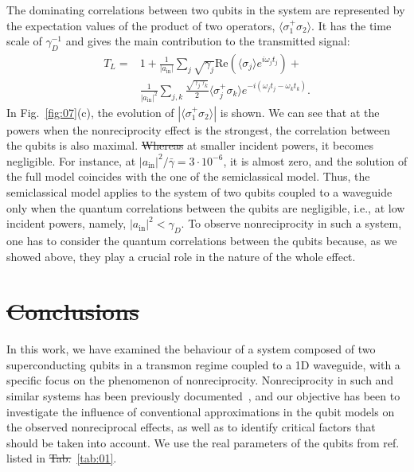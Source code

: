 \documentclass[lettersize,journal]{IEEEtran}
\providecommand{\DIFaddtex}[1]{{\protect\color{blue}\uwave{#1}}} %
\providecommand{\DIFdeltex}[1]{{\protect\color{red}\sout{#1}}}                      %
\providecommand{\DIFaddbegin}{} %
\providecommand{\DIFaddend}{} %
\providecommand{\DIFdelbegin}{} %
\providecommand{\DIFdelend}{} %
\providecommand{\DIFadd}[1]{\texorpdfstring{\DIFaddtex{#1}}{#1}} %
\providecommand{\DIFdel}[1]{\texorpdfstring{\DIFdeltex{#1}}{}} %
\newcommand{\DIFscaledelfig}{0.5}
\newlength{\DIFdelgraphicswidth} %
\newlength{\DIFdelgraphicsheight} %
\newcommand{\DIFaddincludegraphics}[2][]{{\color{blue}\fbox{\DIFOincludegraphics[#1]{#2}}}} %
\newcommand{\DIFdelincludegraphics}[2][]{%
\sbox{\DIFdelgraphicsbox}{\DIFOincludegraphics[#1]{#2}}%
\settoboxwidth{\DIFdelgraphicswidth}{\DIFdelgraphicsbox} %
\settoboxtotalheight{\DIFdelgraphicsheight}{\DIFdelgraphicsbox} %
\scalebox{\DIFscaledelfig}{%
\parbox[b]{\DIFdelgraphicswidth}{\usebox{\DIFdelgraphicsbox}\\[-\baselineskip] \rule{\DIFdelgraphicswidth}{0em}}\llap{\resizebox{\DIFdelgraphicswidth}{\DIFdelgraphicsheight}{%
\setlength{\unitlength}{\DIFdelgraphicswidth}%
\begin{picture}(1,1)%
\thicklines\linethickness{2pt} %
{\color[rgb]{1,0,0}\put(0,0){\framebox(1,1){}}}%
{\color[rgb]{1,0,0}\put(0,0){\line( 1,1){1}}}%
{\color[rgb]{1,0,0}\put(0,1){\line(1,-1){1}}}%
\end{picture}%
}\hspace*{3pt}}} %
} %
\DeclareRobustCommand{\DIFaddbegin}{\DIFOaddbegin \let\includegraphics\DIFaddincludegraphics} %
\DeclareRobustCommand{\DIFaddend}{\DIFOaddend \let\includegraphics\DIFOincludegraphics} %
\DeclareRobustCommand{\DIFdelbegin}{\DIFOdelbegin \let\includegraphics\DIFdelincludegraphics} %
\DeclareRobustCommand{\DIFdelend}{\DIFOaddend \let\includegraphics\DIFOincludegraphics} %
\begin{document}
The dominating correlations between two qubits in the system are represented by the expectation values of the product of two operators, $\langle \sigma_1^+ \sigma_2 \rangle$.
It has the time scale of $\gamma_D^{-1}$ and gives the main contribution to the transmitted signal:
\begin{equation} \label{eq:25}
\begin{aligned}
    T_L =& 1 + \frac{1}{|a_\mathrm{in}|}\sum_j \sqrt{\gamma_j} \mathrm{Re}\left(\langle \sigma_j \rangle e^{i \omega_j t_j}\right) + \\
    &\frac{1}{|a_\mathrm{in}|^2} \sum_{j,k} \frac{\sqrt{\gamma_j \gamma_k}}{2} \langle \sigma_j^+ \sigma_k \rangle e^{-i (\omega_j t_j - \omega_k t_k)}.
\end{aligned}
\end{equation}
In Fig.~\ref{fig:07}(c), the evolution of $|\langle \sigma_1^+ \sigma_2\rangle |$ is shown.
We can see that at the powers when the nonreciprocity effect is the strongest, the correlation between the qubits is also maximal.
\DIFdelbegin \DIFdel{Whereas }\DIFdelend \DIFaddbegin \DIFadd{Meanwhile, }\DIFaddend at smaller incident powers, it becomes negligible.
For instance, at $|a_\mathrm{in}|^2 / \bar{\gamma} = 3\cdot 10^{-6}$, it is almost zero, and the solution of the full model coincides with the one of the semiclassical model.
Thus, the semiclassical model applies to the system of two qubits coupled to a waveguide only when the quantum correlations between the qubits are negligible, i.e., at low incident powers, namely, $|a_\mathrm{in}|^2 < \gamma_D$.
To observe nonreciprocity in such a system, one has to consider the quantum correlations between the qubits because, as we showed above, they play a crucial role in the nature of the whole effect.

\section{\DIFdelbegin \DIFdel{Conclusions}\DIFdelend \DIFaddbegin \DIFadd{Conclusion}\DIFaddend }

In this work, we have examined the behaviour of a system composed of two superconducting qubits in a transmon regime coupled to a 1D waveguide, with a specific focus on the phenomenon of nonreciprocity. 
Nonreciprocity in such and similar systems has been previously documented~\cite{dai_rectification_2015, muller_nonreciprocal_2017, rosario_hamann_nonreciprocity_2018, Nefedkin2022, trivedi_fano-qubits_2023}, and our objective has been to investigate the influence of conventional approximations in the qubit models on the observed nonreciprocal effects, as well as to identify critical factors that should be taken into account.
We use the real parameters of the qubits from ref.~\cite{rosario_hamann_nonreciprocity_2018} listed in \DIFdelbegin \DIFdel{Tab.}\DIFdelend \DIFaddbegin \DIFadd{Table}\DIFaddend ~\ref{tab:01}.
\end{document}
